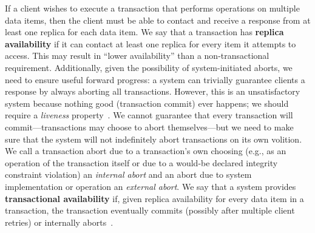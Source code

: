 If a client wishes to execute a transaction that performs operations
on multiple data items, then the client must be able to contact and
receive a response from at least one replica for each data item. We
say that a transaction has \textbf{replica availability} if it can
contact at least one replica for every item it attempts to
access. This may result in ``lower availability'' than a
non-transactional requirement. Additionally, given the possibility of
system-initiated aborts, we need to ensure useful forward progress: a
system can trivially guarantee clients a response by always aborting
all transactions. However, this is an unsatisfactory system because
nothing good (transaction commit) ever happens; we should require a
\textit{liveness} property~\cite{transaction-liveness}. We cannot
guarantee that every transaction will commit---transactions may choose
to abort themselves---but we need to make sure that the system will
not indefinitely abort transactions on its own volition. We call a
transaction abort due to a transaction's own choosing (e.g., as an
operation of the transaction itself or due to a would-be declared
integrity constraint violation) an \textit{internal abort} and an
abort due to system implementation or operation an \textit{external
  abort}. We say that a system provides \textbf{transactional
  availability} if, given replica availability for every data item in
a transaction, the transaction eventually commits (possibly after
multiple client retries) or internally aborts~\cite{hat-hotos}.

